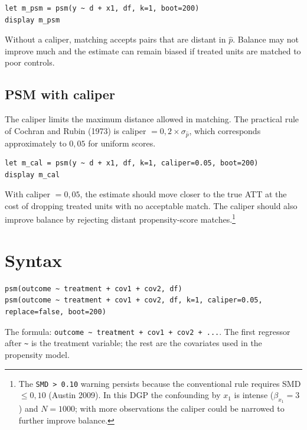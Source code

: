 \begin{lstlisting}[caption={1:1 PSM without caliper}]
let m_psm = psm(y ~ d + x1, df, k=1, boot=200)
display m_psm
\end{lstlisting}

Without a caliper, matching accepts pairs that are distant in $\hat{p}$. Balance
may not improve much and the estimate can remain biased if treated units are
matched to poor controls.

\subsection*{PSM with caliper}

The caliper limits the maximum distance allowed in matching. The practical rule
of Cochran and Rubin (1973) is caliper $= 0{,}2 \times \sigma_{\hat{p}}$, which
corresponds approximately to $0{,}05$ for uniform scores.

\begin{lstlisting}[caption={PSM with caliper = 0.05}]
let m_cal = psm(y ~ d + x1, df, k=1, caliper=0.05, boot=200)
display m_cal
\end{lstlisting}

With caliper $= 0{,}05$, the estimate should move closer to the true ATT at
the cost of dropping treated units with no acceptable match. The caliper should
also improve balance by rejecting distant propensity-score matches.\footnote{%
  The \texttt{SMD > 0.10} warning persists because the conventional rule requires
  SMD $\leq 0{,}10$ (Austin 2009). In this DGP the confounding by $x_1$ is intense
  ($\beta_{x_1} = 3$) and $N = 1000$; with more observations the caliper could
  be narrowed to further improve balance.}

\section{Syntax}

\begin{lstlisting}
psm(outcome ~ treatment + cov1 + cov2, df)
psm(outcome ~ treatment + cov1 + cov2, df, k=1, caliper=0.05, replace=false, boot=200)
\end{lstlisting}

The formula: \lstinline{outcome ~ treatment + cov1 + cov2 + ...}. The first
regressor after \lstinline{~} is the treatment variable; the rest are the
covariates used in the propensity model.

